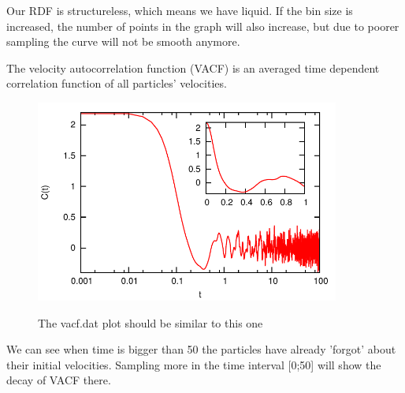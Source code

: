 \documentclass[
paper=a4,                       %
fontsize=11pt,                  %
twoside,                        %
footsepline,                    %
headsepline,                    %
headinclude=false,              %
footinclude=false,              %
pagesize,                       %
]{scrartcl}
\newtheorem{task}{Task}
\begin{document}
\noindent Our RDF is structureless, which means we have liquid. If the bin size is increased, the number of points in the
graph will also increase, but due to poorer sampling the curve will not be smooth anymore. 

\newpage

The velocity autocorrelation function (VACF) is an averaged time dependent correlation function of all particles' 
velocities. 

\vspace{1cm}
\vspace{1cm}

\begin{figure}[ht]
\begin{center}
\includegraphics[width=10cm]{figures/vacf}
\label{fig:vacf}
\caption{The vacf.dat plot should be similar to this one}
\end{center}
\end{figure}

\noindent We can see when time is bigger than 50 the particles have already 'forgot' about their initial
velocities. Sampling more in the time interval [0;50] will show the decay of VACF there.
\end{document}
